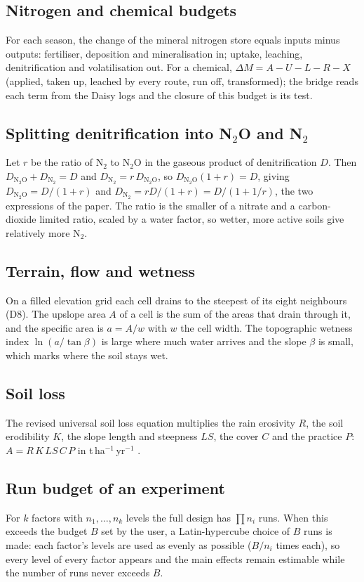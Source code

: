 \subsection{Nitrogen and chemical budgets}
For each season, the change of the mineral nitrogen store equals inputs minus outputs: fertiliser, deposition and mineralisation in; uptake, leaching, denitrification and volatilisation out. For a chemical, $\Delta M=A-U-L-R-X$ (applied, taken up, leached by every route, run off, transformed); the bridge reads each term from the Daisy logs and the closure of this budget is its test.

\subsection{Splitting denitrification into N$_2$O and N$_2$}
Let $r$ be the ratio of N$_2$ to N$_2$O in the gaseous product of denitrification $D$. Then $D_{\mathrm{N_2O}}+D_{\mathrm{N_2}}=D$ and $D_{\mathrm{N_2}}=r\,D_{\mathrm{N_2O}}$, so $D_{\mathrm{N_2O}}(1+r)=D$, giving $D_{\mathrm{N_2O}}=D/(1+r)$ and $D_{\mathrm{N_2}}=rD/(1+r)=D/(1+1/r)$, the two expressions of the paper. The ratio is the smaller of a nitrate and a carbon-dioxide limited ratio, scaled by a water factor, so wetter, more active soils give relatively more N$_2$.

\subsection{Terrain, flow and wetness}
On a filled elevation grid each cell drains to the steepest of its eight neighbours (D8). The upslope area $A$ of a cell is the sum of the areas that drain through it, and the specific area is $a=A/w$ with $w$ the cell width. The topographic wetness index $\ln(a/\tan\beta)$ is large where much water arrives and the slope $\beta$ is small, which marks where the soil stays wet.

\subsection{Soil loss}
The revised universal soil loss equation multiplies the rain erosivity $R$, the soil erodibility $K$, the slope length and steepness $LS$, the cover $C$ and the practice $P$: $A=R\,K\,LS\,C\,P$ in t\,ha$^{-1}$\,yr$^{-1}$ \citep{Renard1994}.

\subsection{Run budget of an experiment}
For $k$ factors with $n_1,\dots,n_k$ levels the full design has $\prod n_i$ runs. When this exceeds the budget $B$ set by the user, a Latin-hypercube choice of $B$ runs is made: each factor's levels are used as evenly as possible ($B/n_i$ times each), so every level of every factor appears and the main effects remain estimable while the number of runs never exceeds $B$.

